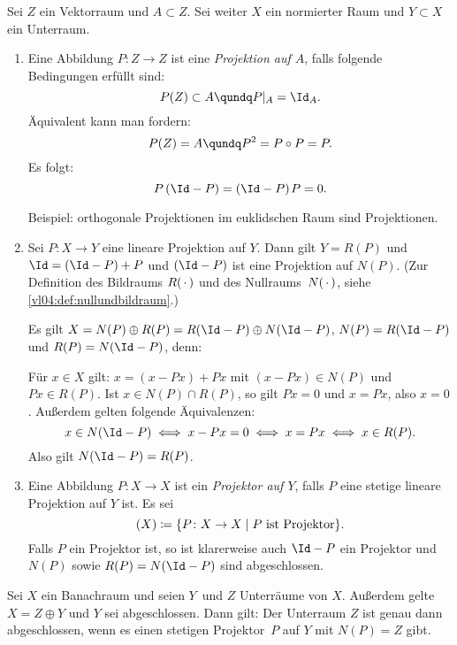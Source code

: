 \begin{thEmpty}[Projektoren]
    Sei $Z$ ein Vektorraum und $A\subset Z$. Sei weiter 
    $X$ ein normierter Raum und $Y\subset X$ ein Unterraum.
    \begin{enumerate}[(1)]
        \item
            Eine Abbildung $P\colon Z\to Z$ ist eine \emph{Projektion auf $A$},
            falls folgende Bedingungen erfüllt sind:
            \[ P(Z) \subset A \qundq P\vert_A = \Id_A   . \]
            Äquivalent kann man fordern:
            \[ P(Z) = A \qundq P^2 = P\circ P = P  . \]
            Es folgt:
            \[ P\,(\Id-P) = (\Id-P)\mkern2muP = 0  . \]
            
            Beispiel: orthogonale Projektionen im euklidschen
            Raum sind Projektionen.
            
        \item
            Sei $P\colon X\to Y$ eine lineare Projektion auf $Y$. Dann gilt
            $Y=R(P)$ und $\Id=(\Id-P)+P$ und $(\Id-P)$ ist eine Projektion auf
            $N(P)$.  (Zur Definition des Bildraums $R(\,\cdot\,)$ und des
            Nullraums~$N(\,\cdot\,)$, siehe \cref{vl04:def:nullundbildraum}.)
            
            Es gilt $X=N(P)\oplus R(P) = R(\Id-P)\oplus N(\Id-P)$,
            $N(P)=R(\Id-P)$ und $R(P)=N(\Id-P)$, denn:
            
            Für $x\in X$ gilt: $x = (x-Px) + Px$ mit $(x-Px)\in N(P)$ und 
            $Px\in R(P)$. Ist $x\in N(P) \cap R(P)$, so gilt $Px=0$ und $x=Px$,
            also $x=0$. Außerdem gelten folgende Äquivalenzen:
            \[ x\in N(\Id-P) \iff x-Px = 0 \iff x=Px \iff x\in R(P) . \]
            Also gilt $N(\Id-P) = R(P)$.
            
        \item
            Eine Abbildung $P\colon X\to X$ ist ein \emph{Projektor auf $Y$},
            falls $P$ eine stetige lineare Projektion auf $Y$ ist. Es sei
            \[ \Pr(X) \defeq \{ P\colon X\to X \Mid P\text{ ist Projektor} \} 
            . \]
            Falls $P$ ein Projektor ist, so ist klarerweise auch
            $\Id-P$ ein Projektor und $N(P)$ sowie $R(P)=N(\Id-P)$ sind
            abgeschlossen.
    \end{enumerate}
\end{thEmpty}
%

\begin{thSatz}
    Sei $X$ ein Banachraum und seien $Y$~und $Z$ Unterräume von $X$. Außerdem
    gelte $X = Z\oplus Y$ und $Y$ sei abgeschlossen. Dann gilt:
    Der Unterraum $Z$ ist genau dann abgeschlossen, wenn es einen stetigen
    Projektor~$P$ auf $Y$ mit $N(P)=Z$ gibt.
\end{thSatz}

